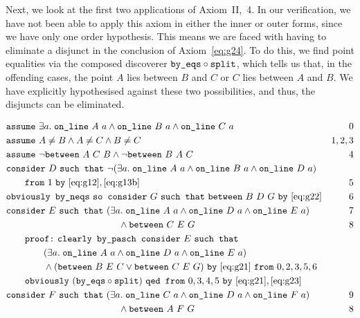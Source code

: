 Next, we look at the first two applications of Axiom~II,~4. In our verification, we have not been able to apply this axiom in either the inner or outer forms, since we have only one order hypothesis. This means we are faced with having to eliminate a disjunct in the conclusion of Axiom~\ref{eq:g24}. To do this, we find point equalities via the composed discoverer $\texttt{by\_eqs}\circ\texttt{split}$, which tells us that, in the offending cases, the point $A$ lies between $B$ and $C$ or $C$ lies between $A$ and $B$. We have explicitly hypothesised against these two possibilities, and thus, the disjuncts can be eliminated.

\begin{boxedfigure}
\begin{align*}
& \code{assume}\ \exists a.\; \code{on\_line}\ A\ a\wedge\code{on\_line}\ B\ a\wedge\code{on\_line}\ C\ a & 0\\
& \code{assume}\ A\neq B \wedge A\neq C \wedge B \neq C & 1,2,3\\
& \code{assume}\ \neg\between{A}{C}{B} \wedge \neg\between{B}{A}{C} & 4\\
& \code{consider}\ D\ \code{such that}\ \Triangle{a}{A}{B}{D}\\
& \qquad\code{from}\ 1\ \code{by}\ \eqref{eq:g12},\eqref{eq:g13b}& 5\\
& \code{obviously by\_neqs}\ \code{so consider}\ G\ \code{such that}\ \between{B}{D}{G}\ \code{by}\ \eqref{eq:g22} & 6\\
& \code{consider}\ E\ \code{such that}\ (\exists a.\; \code{on\_line}\ A\ a\wedge \code{on\_line}\ D\ a\wedge \code{on\_line}\ E\ a) & 7\\
& \qquad\qquad\qquad\qquad\qquad\qquad \wedge\between{C}{E}{G}\ & 8\\
&\qquad \code{proof:}\ \code{clearly by\_pasch consider}\ E\ \code{such that}\\
&\qquad\qquad (\exists a.\; \code{on\_line}\ A\ a\wedge \code{on\_line}\ D\ a\wedge \code{on\_line}\ E\ a)\\
&\qquad\qquad \wedge (\between{B}{E}{C} \vee \between{C}{E}{G})\ \code{by}\ \eqref{eq:g21}\ \code{from}\ 0,2,3,5,6\\
&\qquad\code{obviously}\ (\code{by\_eqs}\circ\code{split})\ \code{qed from}\ 0,3,4,5\ \code{by}\ \eqref{eq:g21},\eqref{eq:g23}\\
& \code{consider}\ F\ \code{such that}\ (\exists a.\; \code{on\_line}\ C\ a\wedge \code{on\_line}\ D\ a\wedge \code{on\_line}\ F\ a) & 9\\
& \qquad\qquad\qquad\qquad\qquad\qquad \wedge\between{A}{F}{G}\ & 8\\

\end{align*}
\end{boxedfigure}
